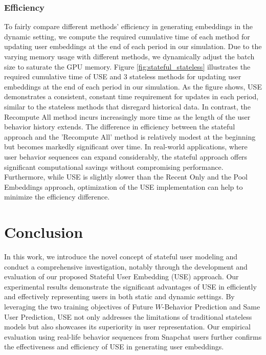 \documentclass{article}
\begin{document}
\subsubsection{Efficiency}
To fairly compare different methods' efficiency in generating embeddings in the dynamic setting, we compute the required cumulative time of each method for updating user embeddings at the end of each period in our simulation. Due to the varying memory usage with different methods, we dynamically adjust the batch size to saturate the GPU memory.
Figure \ref{fig:stateful_stateless} illustrates the required cumulative time of USE and $3$ stateless methods for updating user embeddings at the end of each period in our simulation. As the figure shows, USE demonstrates a consistent, constant time requirement for updates in each period, similar to the stateless methods that disregard historical data. In contrast, the Recompute All method incurs increasingly more time as the length of the user behavior history extends. The difference in efficiency between the stateful approach and the 'Recompute All' method is relatively modest at the beginning but becomes markedly significant over time. In real-world applications, where user behavior sequences can expand considerably, the stateful approach offers significant computational savings without compromising performance. Furthermore, while USE is slightly slower than the Recent Only and the Pool Embeddings approach, optimization of the USE implementation can help to minimize the efficiency difference.




\section{Conclusion}
In this work, we introduce the novel concept of stateful user modeling and conduct a comprehensive investigation, notably through the development and evaluation of our proposed Stateful User Embedding (USE) approach. Our experimental results demonstrate the significant advantages of USE in efficiently and effectively representing users in both static and dynamic settings. By leveraging the two training objectives of Future $W$-Behavior Prediction and Same User Prediction, USE not only addresses the limitations of traditional stateless models but also showcases its superiority in user representation. Our empirical evaluation using real-life behavior sequences from Snapchat users further confirms the effectiveness and efficiency of USE in generating user embeddings.
\end{document}
